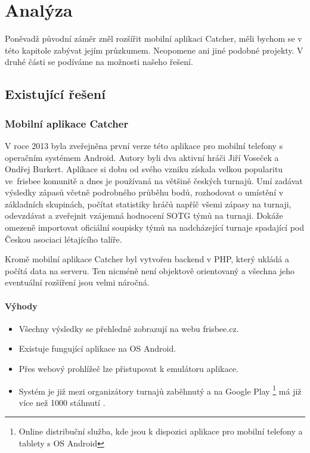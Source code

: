 \chapter{Analýza}

\indent

Poněvadž původní záměr zněl rozšířit mobilní aplikaci Catcher,
měli bychom se v této kapitole zabývat jejím průzkumem. Neopomene ani jiné podobné projekty.
V druhé části se podíváme na možnosti našeho řešení.

\section{Existující řešení}

\subsection*{Mobilní aplikace Catcher}

\indent

V roce 2013 \cite{cald-catcher} byla zveřejněna první verze této aplikace pro mobilní telefony s operačním systémem Android.
Autory byli dva aktivní hráči Jiří Voseček a Ondřej Burkert. Aplikace si dobu od svého vzniku získala velkou popularitu
ve~frisbee komunitě a dnes je používaná na většině českých turnajů. Umí zadávat výsledky
zápasů včetně podrobného průběhu bodů, rozhodovat o umístění v základních skupinách, počítat statistiky hráčů napříč
všemi zápasy na turnaji, odevzdávat a zveřejnit vzájemná hodnocení SOTG týmů na turnaji. Dokáže omezeně importovat oficiální soupisky týmů
na nadcházející turnaje spadající pod Českou asociaci létajícího talíře.

\medskip

Kromě mobilní aplikace Catcher byl vytvořen backend v PHP, který ukládá a počítá data na serveru. Ten nicméně není
objektově orientovaný a všechna jeho eventuální rozšíření jsou velmi náročná.

\subsubsection*{Výhody}
\begin{itemize}
  \item Všechny výsledky se přehledně zobrazují na webu frisbee.cz.
  \item Existuje fungující aplikace na OS Android.
  \item Přes webový prohlížeč lze přistupovat k emulátoru aplikace.
  \item Systém je již mezi organizátory turnajů zaběhnutý a na Google Play
    \footnote{Online distribuční služba, kde jsou k dispozici aplikace pro mobilní telefony a tablety s OS Android}
    má již více než 1000 stáhnutí \cite{catcher-play}.
\end{itemize}

